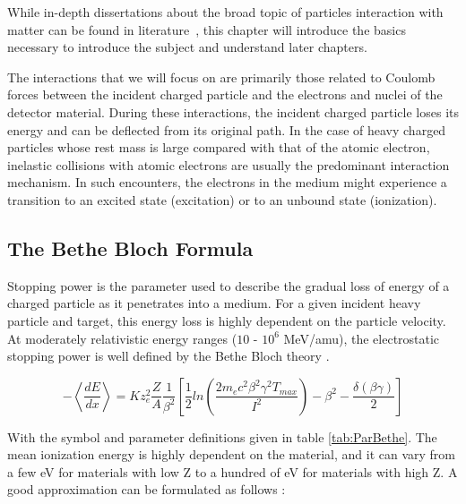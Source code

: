 \pagestyle{fancy}

\graphicspath{ {Figures/Chapter2_BeamMatterInteraction/} }

While in-depth dissertations about the broad topic of particles interaction with matter can be found in literature~\parencite*[]{ref:Knoll,ref:Evans,ref:avernier}, 
this chapter will introduce the basics  necessary to introduce the subject and understand later chapters.

The interactions that we will focus on are primarily those related to Coulomb forces between the incident charged particle and the electrons and nuclei of the detector material. During these interactions, the incident charged particle loses its energy and can be deflected from its original path. In the case of heavy charged particles whose rest mass is large compared with that of the atomic electron, inelastic collisions with atomic electrons are usually the predominant interaction mechanism. In such encounters, the electrons in the medium might experience a transition to an excited state (excitation) or to an unbound state (ionization). 

\subsection{The Bethe Bloch Formula}
\label{sec:Bethe}

Stopping power is the parameter used to describe the gradual loss of energy of a charged particle as it penetrates into a medium. For a given incident heavy particle and target, this energy loss is highly dependent on the particle velocity. At moderately relativistic energy ranges ($10$ - $10^6$ \si[]{\mega \electronvolt}/amu), the electrostatic stopping power is well defined by the Bethe Bloch theory \parencite[]{ref:Bethe}. 

\begin{equation}
    - \left< \frac{dE}{dx} \right> = Kz^2_e\frac{Z}{A}\frac{1}{\beta^2}\left[ \frac{1}{2} ln \left( \frac{2m_e c^2 \beta^2 \gamma^2 T_{max}}{I^2}\right) -\beta^2 - \frac{\delta\left(\beta \gamma\right)}{2} \right]
    \label{eq:bethe}
\end{equation}

With the symbol and parameter definitions given in table \ref{tab:ParBethe}. The mean ionization energy is highly dependent on the material, and it can vary from a few \si[]{\electronvolt} for materials with low Z to a hundred of \si[]{\electronvolt} for materials with high Z. A good approximation can be formulated as follows \parencite*[][]{ref:IonizationEne}:

